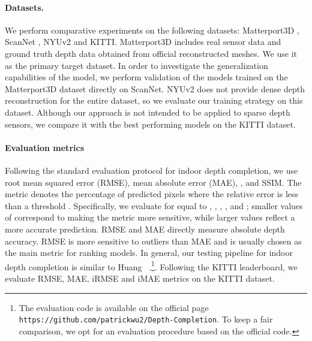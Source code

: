 \documentclass[final]{cvpr}
\begin{document}
    \paragraph{Datasets.} 
    We perform comparative experiments on the following datasets: Matterport3D \cite{Matterport3D}, ScanNet \cite{dai2017scannet}, NYUv2 \cite{nyuv2} and KITTI\cite{uhrig}. Matterport3D includes real sensor data and ground truth depth data obtained from official reconstructed meshes. We use it as the primary target dataset. In order to investigate the generalization capabilities of the model, we perform validation of the models trained on the Matterport3D dataset directly on ScanNet. NYUv2 does not provide dense depth reconstruction for the entire dataset, so we evaluate our training strategy on this dataset. Although our approach is not intended to be applied to sparse depth sensors, we compare it with the best performing models on the KITTI dataset.
    








    
    \paragraph{Evaluation metrics}
    Following the standard evaluation protocol for indoor depth completion, we use root mean squared error (RMSE), mean absolute error (MAE), , and SSIM. The  metric denotes the percentage of predicted pixels where the relative error is less than a threshold . Specifically, we evaluate  for  equal to , , , , and ; smaller values of  correspond to making the  metric more sensitive, while larger values reflect a more accurate prediction. RMSE and MAE directly measure absolute depth accuracy. RMSE is more sensitive to outliers than MAE and is usually chosen as the main metric for ranking models. In general, our testing pipeline for indoor depth completion is similar to Huang \etal~\cite{Huang_2019}.\footnote{The evaluation code is available on the official page \texttt{https://github.com/patrickwu2/Depth-Completion}. To keep a fair comparison, we opt for an evaluation procedure based on the official code.}. Following the KITTI leaderboard, we evaluate RMSE, MAE, iRMSE and iMAE metrics on the KITTI dataset.
    
\end{document}
